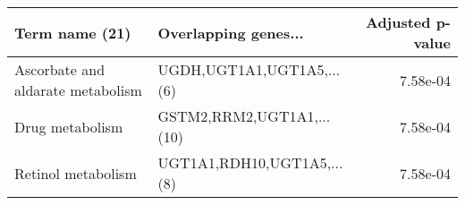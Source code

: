 \begin{tabular}{llr}
\toprule
                   Term name (21) &       Overlapping genes... &  Adjusted p-value \\
\midrule
Ascorbate and aldarate metabolism &  UGDH,UGT1A1,UGT1A5,...(6) &          7.58e-04 \\
                  Drug metabolism &  GSTM2,RRM2,UGT1A1,...(10) &          7.58e-04 \\
               Retinol metabolism & UGT1A1,RDH10,UGT1A5,...(8) &          7.58e-04 \\
\bottomrule
\end{tabular}
